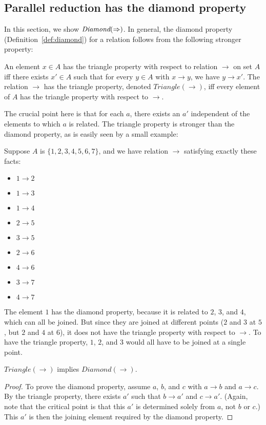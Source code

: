 \subsection{Parallel reduction has the diamond property}

In this section, we show $\textit{Diamond}(\Rightarrow)$.  In general, the diamond property (Definition~\ref{def:diamond}) for a relation follows from the following stronger property:

\begin{definition}
  \label{def:triangle}
  An element $x\in A$ has the triangle property with respect to relation $\to$ on set $A$
  iff there exists $x'\in A$ such that for every $y \in A$ with $x \to y$, we have $y \to x'$.
  The relation $\to$ has the triangle
  property, denoted $\textit{Triangle}(\to)$, iff every element of $A$ has
  the triangle property with respect to $\to$.  
\end{definition}

\noindent The crucial point here is that for each $a$, there exists an $a'$ independent of the
elements to which $a$ is related. The triangle property is stronger than the diamond property,
as is easily seen by a small example:

\begin{example}
  Suppose $A$ is $\{1,2,3,4,5,6,7\}$, and we have relation $\to$ satisfying exactly these facts:
  \begin{itemize}
  \item $1 \to 2$
  \item $1 \to 3$
  \item $1 \to 4$
  \item $2 \to 5$
  \item $3 \to 5$
  \item $2 \to 6$
  \item $4 \to 6$    
  \item $3 \to 7$
  \item $4 \to 7$
  \end{itemize}
  The element $1$ has the diamond property, because it is related to $2$, $3$, and $4$, which can
  all be joined.  But since they are joined at different points ($2$ and $3$ at $5$, but $2$ and $4$ at $6$),
  it does not have the triangle property with respect to $\to$.  To have the triangle property, $1$, $2$, and $3$
  would all have to be joined at a single point.
\end{example}

\begin{lemma}
  \label{lem:tridi}
  $\textit{Triangle}(\to)$ implies $\textit{Diamond}(\to)$.
\end{lemma}
\begin{proof}
  To prove the diamond property, assume $a$, $b$, and $c$ with
  $a \to b$ and $a \to c$.  By the triangle property, there exists
  $a'$ such that $b \to a'$ and $c \to a'$.  (Again, note that
  the critical point is that this $a'$ is determined solely from
  $a$, not $b$ or $c$.)  This $a'$ is then the joining element
  required by the diamond property.
\end{proof}





